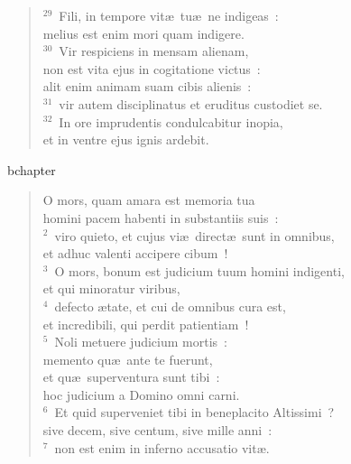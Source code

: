 \begin{verse}${}^{29}$~Fili, in tempore vit\ae\ tu\ae\ ne indigeas~:\\ melius est enim mori quam indigere.\\
${}^{30}$~Vir respiciens in mensam alienam,\\ non est vita ejus in cogitatione victus~:\\ alit enim animam suam cibis alienis~:\\
${}^{31}$~vir autem disciplinatus et eruditus custodiet se.\\
${}^{32}$~In ore imprudentis condulcabitur inopia,\\ et in ventre ejus ignis ardebit.\end{verse}


bchapter\begin{verse}\vspace{-19pt}O mors, quam amara est memoria tua\\ homini pacem habenti in substantiis suis~:\\
${}^{2}$~viro quieto, et cujus vi\ae\ direct\ae\ sunt in omnibus,\\ et adhuc valenti accipere cibum~!\\
${}^{3}$~O mors, bonum est judicium tuum homini indigenti,\\ et qui minoratur viribus,\\
${}^{4}$~defecto \ae tate, et cui de omnibus cura est,\\ et incredibili, qui perdit patientiam~!\\
${}^{5}$~Noli metuere judicium mortis~:\\ memento qu\ae\ ante te fuerunt,\\ et qu\ae\ superventura sunt tibi~:\\ hoc judicium a Domino omni carni.\\
${}^{6}$~Et quid superveniet tibi in beneplacito Altissimi~?\\ sive decem, sive centum, sive mille anni~:\\
${}^{7}$~non est enim in inferno accusatio vit\ae .\end{verse}


